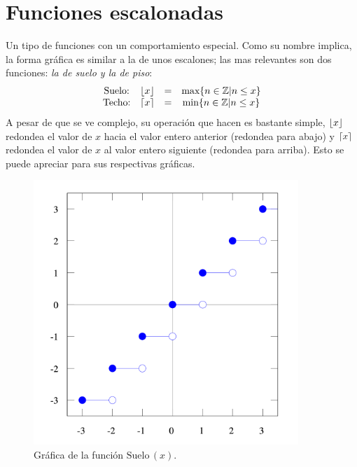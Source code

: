 \documentclass[letterpaper, 12pt]{article}
\DeclarePairedDelimiter\ceil{\lceil}{\rceil}
\DeclarePairedDelimiter\floor{\lfloor}{\rfloor}
\begin{document}
        \section{Funciones escalonadas}
        Un tipo de funciones con un comportamiento especial. Como su nombre implica, la forma gráfica es similar a la de unos escalones; las mas relevantes son dos funciones: \emph{la de suelo y la de piso}:
        \[\begin{matrix}
            \text{Suelo:}&\floor*{x}&=&\text{max}\{n\in\mathbb{Z}|n\leq x\}\\
            \text{Techo:}&\ceil*{x}&=&\text{min}\{n\in\mathbb{Z}|n\leq x\}
        \end{matrix}\]
        A pesar de que se ve complejo, su operación que hacen es bastante simple, \(\floor*{x}\) redondea el valor de \(x\) hacia el valor entero anterior (redondea para abajo) y \(\ceil*{x}\) redondea el valor de \(x\) al valor entero siguiente (redondea para arriba).
        Esto se puede apreciar para sus respectivas gráficas.
        \begin{figure}[H]
            \centering
            \includegraphics[width=10cm]{suelo.png}
            \caption{Gráfica de la función \(\text{Suelo}\,(x)\).}
        \end{figure}
\end{document}
